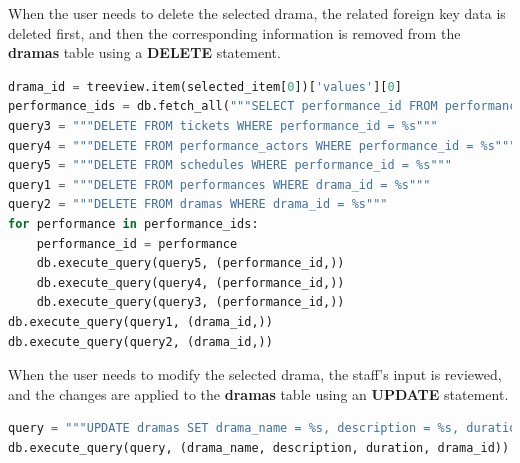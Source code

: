 \documentclass[12pt]{article}
\begin{document}
\par When the user needs to delete the selected drama, the related foreign key data is deleted first, and then the corresponding information is removed from the \textbf{dramas} table using a \textbf{DELETE} statement.
\begin{tcolorbox}[colframe=black, colback=white, boxrule=0.4mm, sharp corners=southwest, title=Excerpt of Drama Deletion Code]
    \begin{lstlisting}[language=Python, breaklines=true]
drama_id = treeview.item(selected_item[0])['values'][0]
performance_ids = db.fetch_all("""SELECT performance_id FROM performances WHERE drama_id = %s""", (drama_id,))
query3 = """DELETE FROM tickets WHERE performance_id = %s"""
query4 = """DELETE FROM performance_actors WHERE performance_id = %s"""
query5 = """DELETE FROM schedules WHERE performance_id = %s"""
query1 = """DELETE FROM performances WHERE drama_id = %s"""
query2 = """DELETE FROM dramas WHERE drama_id = %s"""
for performance in performance_ids:
    performance_id = performance
    db.execute_query(query5, (performance_id,))
    db.execute_query(query4, (performance_id,))
    db.execute_query(query3, (performance_id,))
db.execute_query(query1, (drama_id,))
db.execute_query(query2, (drama_id,))
\end{lstlisting}
\end{tcolorbox}

\par When the user needs to modify the selected drama, the staff's input is reviewed, and the changes are applied to the \textbf{dramas} table using an \textbf{UPDATE} statement.
\begin{tcolorbox}[colframe=black, colback=white, boxrule=0.4mm, sharp corners=southwest, title=Excerpt of Drama Edit Code]
    \begin{lstlisting}[language=Python, breaklines=true]
query = """UPDATE dramas SET drama_name = %s, description = %s, duration = %s WHERE drama_id = %s"""
db.execute_query(query, (drama_name, description, duration, drama_id))
\end{lstlisting}
\end{tcolorbox}
\end{document}
